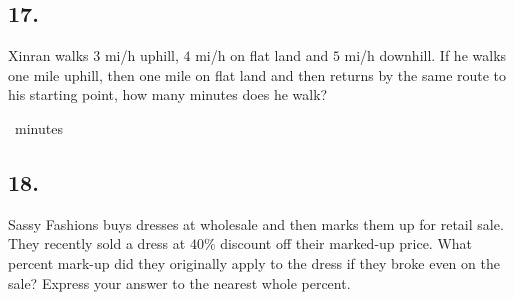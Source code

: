 \documentclass[12pt]{article}
\begin{document}
\subsection*{17.}
Xinran walks $3$ mi/h uphill, $4$ mi/h on flat land and $5$ mi/h downhill. If he walks one mile uphill, then one mile on flat land and then returns by the same route to his starting point, how many minutes does he walk? 

\nopagebreak

\fbox{\phantom{ANSWER}}~minutes

\begin{answer}
%
\end{answer}


\subsection*{18.}
Sassy Fashions buys dresses at wholesale and then marks them up for retail sale. They recently sold a dress at $40\%$ discount off their marked-up price. What percent mark-up did they originally apply to the dress if they broke even on the sale? Express your answer to the nearest whole percent. 
\end{document}
